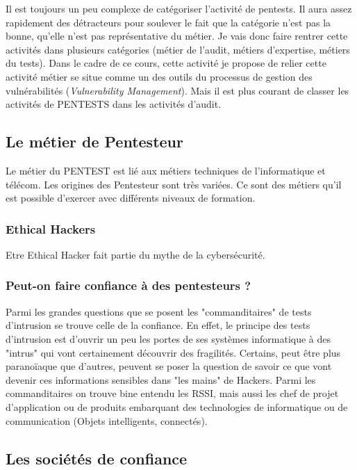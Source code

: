 Il est toujours un peu complexe de catégoriser l'activité de pentests. Il aura assez rapidement des détracteurs pour soulever le fait que la catégorie n'est pas la bonne, qu'elle n'est pas représentative du métier. 
Je vais donc faire rentrer cette activités dans plusieurs catégories (métier de l'audit, métiers d'expertise, métiers du tests).
Dans le cadre de ce cours, cette activité je propose de relier cette activité métier se situe comme un des outils du processus de gestion des vulnérabilités (\emph{Vulnerability Management}).  Mais il est plus courant de  classer les activités de PENTESTS dans les activités d'audit.

\subsection{Le métier de Pentesteur}

Le métier du PENTEST est  lié aux métiers techniques de l'informatique et télécom. Les origines des Pentesteur sont très variées.
Ce sont des métiers qu'il est possible d'exercer avec différents niveaux de formation. 

\subsubsection{ Ethical Hackers}
Etre Ethical Hacker fait partie du mythe de la cybersécurité.

\subsubsection{Peut-on faire confiance à des pentesteurs ?}
Parmi les grandes questions que se posent les "commanditaires" de tests d'intrusion se trouve celle de la confiance.
En effet, le principe des tests d'intrusion est d'ouvrir un peu les portes de ses systèmes informatique à des "intrus" qui vont certainement découvrir des fragilités.
Certains, peut être plus paranoïaque que d'autres, peuvent se poser la question de savoir ce que vont devenir ces informations sensibles dans "les mains" de Hackers.
Parmi les commanditaires on trouve bine entendu les RSSI, mais aussi les chef de projet d'application ou de produits embarquant des technologies de informatique ou de communication (Objets intelligents, connectés).

\subsection{Les sociétés de confiance}

